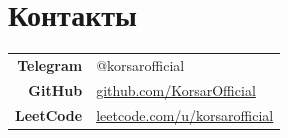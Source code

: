 \documentclass[10pt, a4paper]{article}
\begin{document}
\vspace{-2pt}

\section{Контакты}

\begin{tabularx}{\textwidth}{@{}r|X@{}}
\textbf{\small Telegram} & @korsarofficial \\
\textbf{\small GitHub} & \href{https://github.com/KorsarOfficial}{github.com/KorsarOfficial} \\
\textbf{\small LeetCode} & \href{https://leetcode.com/u/korsarofficial}{leetcode.com/u/korsarofficial} \\
\end{tabularx}
\end{document}
